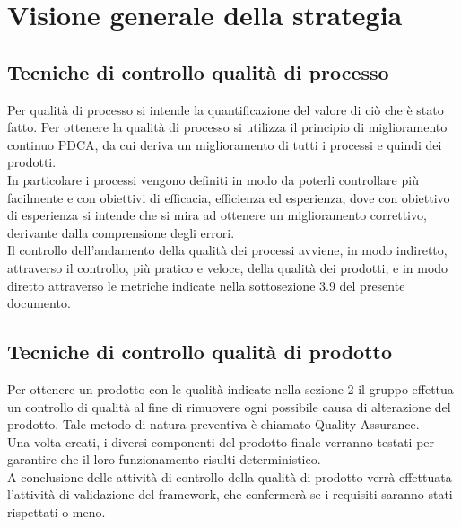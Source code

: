 
\section{Visione generale della strategia}
\subsection{Tecniche di controllo qualità di processo}
	Per qualità di processo si intende la quantificazione del valore di ciò che è stato fatto. Per ottenere la qualità di processo si utilizza il principio di miglioramento continuo PDCA, da cui deriva un miglioramento di tutti i processi e quindi dei prodotti.\\
	In particolare i processi vengono definiti in modo da poterli controllare più facilmente e con obiettivi di efficacia, efficienza ed esperienza, dove con obiettivo di esperienza si intende che si mira ad ottenere un miglioramento correttivo, derivante dalla comprensione degli errori.\\
	Il controllo dell'andamento della qualità dei processi avviene, in modo indiretto, attraverso il controllo, più pratico e veloce, della qualità dei prodotti, e in modo diretto attraverso le metriche indicate nella sottosezione 3.9 del presente documento.
\subsection{Tecniche di controllo qualità di prodotto}
	Per ottenere un prodotto con le qualità indicate nella sezione 2 il gruppo \groupname effettua un controllo di qualità al fine di rimuovere ogni possibile causa di alterazione del prodotto. Tale metodo di natura preventiva è chiamato Quality Assurance.\\
	Una volta creati, i diversi componenti del prodotto finale verranno testati per garantire che il loro funzionamento risulti deterministico.\\
	A conclusione delle attività di controllo della qualità di prodotto verrà effettuata l'attività di validazione del framework, che confermerà se i requisiti saranno stati rispettati o meno.
